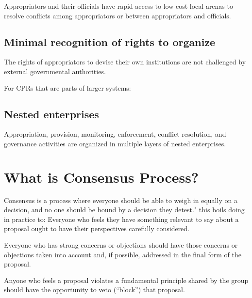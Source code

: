 \documentclass{article}
\begin{document}
Appropriators and their officials have rapid access to low-cost local arenas to resolve conflicts among appropriators or between appropriators and officials.

\subsection{Minimal recognition of rights to organize}

The rights of appropriators to devise their own institutions are not challenged by external governmental authorities.

For CPRs that are parts of larger systems:

\subsection{Nested enterprises}

Appropriation, provision, monitoring, enforcement, conflict resolution, and governance activities are organized in multiple layers of nested enterprises.





\pagebreak
\section{What is Consensus Process?}

Consensus is a process where everyone should be able to weigh in equally on a decision, and no one should be bound by a decision they detest."
this boils doing in practice to: Everyone who feels they have something relevant to say about a proposal ought to have their perspectives carefully considered.

Everyone who has strong concerns or objections should have those concerns or objections taken into account and, if possible, addressed in the final form of the proposal.

Anyone who feels a proposal violates a fundamental principle shared by the group should have the opportunity to veto (“block”) that proposal.
\end{document}
